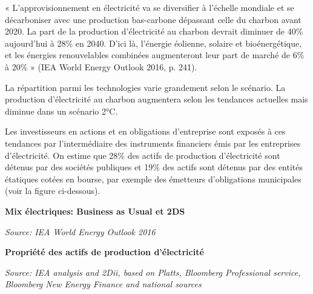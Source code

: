 \documentclass[10pt,table,a4]{article}\usepackage[]{graphicx}\usepackage[]{color}
\begin{document}
\begin{multicols}{2}
{		
		« L'approvisionnement en électricité va se diversifier à l'échelle mondiale et se décarboniser avec une production bas-carbone dépassant celle du charbon avant 2020. La part de la production d'électricité au charbon devrait diminuer de 40\% aujourd'hui à 28\% en 2040. D'ici là, l'énergie éolienne, solaire et bioénergétique, et les énergies renouvelables combinées augmenteront leur part de marché de 6\% à 20\% » (IEA World Energy Outlook 2016, p. 241).
		
		
		La répartition parmi les technologies varie grandement selon le scénario. La production d'électricité au charbon augmentera selon les tendances actuelles mais diminue dans un scénario 2°C.
		
		
		Les investisseurs en actions et en obligations d’entreprise sont exposés à ces tendances par l'intermédiaire des instruments financiers émis par les entreprises d'électricité. On estime que 28\% des actifs de production d'électricité sont détenus par des sociétés publiques et 19\% des actifs sont détenus par des entités étatiques cotées en bourse, par exemple des émetteurs d'obligations municipales (voir la figure ci-dessous).}
		
	\end{multicols}
	
	\begin{multicols}{2}
		
		\vspace{-.2cm}
		{\small\textbf{Mix électriques: Business as Usual et 2DS}}
		
		
		
		
		
		\textit{\small Source: IEA World Energy Outlook 2016
		}
	\par
		\vspace{0.5cm}
		
		{\small\textbf{Propriété des actifs de production d'électricité}}
		\newline
		
		
		\textit{\small Source: IEA analysis and 2Dii, based on Platts, Bloomberg Professional service, Bloomberg New Energy Finance and national sources}
		
	\end{multicols}
\end{document}
